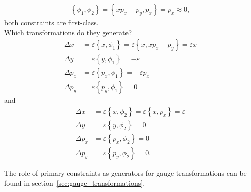 \begin{solution}
\begin{align*}
\left \{ \phi_1,\phi_2 \right \} = \left \{ x p_x - p_y,p_x \right \} = p_x \approx 0,
\end{align*}
both constraints are first-class. \\
Which transformations do they generate?
\begin{align*}
\Delta x &= \varepsilon \left \{ x,\phi_1 \right \} = \varepsilon \left \{ x,x p_x - p_y \right \} = \varepsilon x \\
\Delta y &= \varepsilon \left \{ y,\phi_1 \right \} = - \varepsilon \\
\Delta p_x &= \varepsilon \left \{ p_x,\phi_1 \right \} = - \varepsilon p_x \\
\Delta p_y &= \varepsilon \left \{ p_y,\phi_1 \right \} = 0
\end{align*}
and 
\begin{align*}
\Delta x &= \varepsilon \left \{ x,\phi_2 \right \} = \varepsilon \left \{ x,p_x \right \} = \varepsilon \\
\Delta y &= \varepsilon \left \{ y,\phi_2 \right \} = 0 \\
\Delta p_x &= \varepsilon \left \{ p_x,\phi_2 \right \} = 0 \\
\Delta p_y &= \varepsilon \left \{ p_y,\phi_2 \right \} = 0.
\end{align*}

The role of primary constraints as generators for gauge transformations can be found in section~\vref{sec:gauge_transformations}.
\end{solution}





